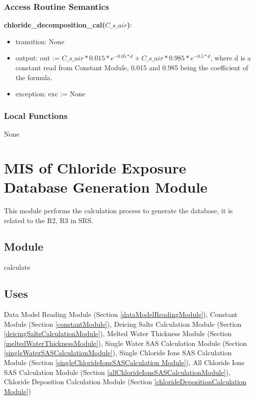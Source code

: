 \documentclass[12pt, titlepage]{article}
\begin{document}
\subsubsection{Access Routine Semantics}

\noindent \textbf{chloride\_decomposition\_cal($C\_s\_air$)}:
\begin{itemize}
\item transition: None
\item output: out := $C\_s\_air * 0.015 * e^{-0.05*d}  + C\_s\_air*0.985 * e^{-0.5*d}$, where d is a constant read from Constant Module, 0.015 and 0.985 being the coefficient of the formula.
\item exception: exc := None
\end{itemize}

\subsubsection{Local Functions}
None
\newpage

\section{MIS of Chloride Exposure Database Generation Module} \label{calculationResultModule}
This module performs the calculation process to generate the database, it is related to the R2, R3 in SRS.


\subsection{Module}

calculate

\subsection{Uses}

Data Model Reading Module (Section \ref{dataModelReadingModule}), 
Constant Module (Section \ref{constantModule}), Deicing Salts Calculation Module (Section \ref{deicingSaltsCalculationModule}), Melted Water Thickness Module (Section \ref{meltedWaterThicknessModule}), Single Water SAS Calculation Module (Section \ref{singleWaterSASCalculationModule}), Single Chloride Ions SAS Calculation Module (Section \ref{singleChlorideIonsSASCalculation Module}), All Chloride Ions SAS Calculation Module (Section \ref{allChlorideIonsSASCalculationModule}), Chloride Deposition Calculation Module (Section \ref{chlorideDepositionCalculation Module})
\end{document}
